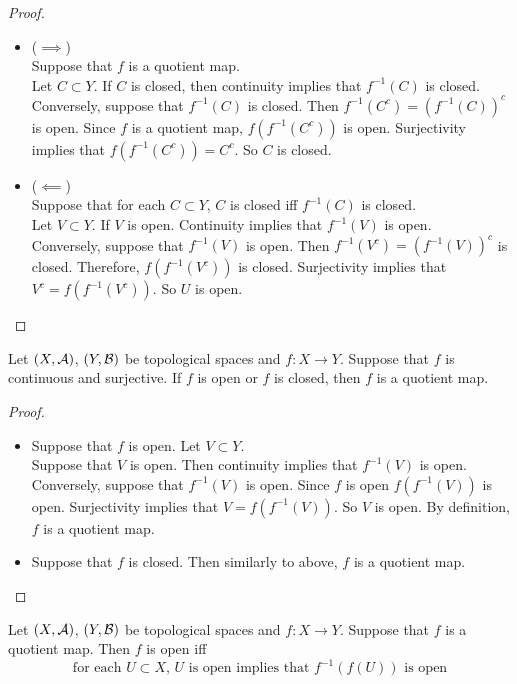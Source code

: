 \documentclass{book}
\begin{document}
	\begin{proof}\
	\begin{itemize}
	\item ($\implies$) \\
	Suppose that $f$ is a quotient map.\\
	Let $C \subset Y$. If $C$ is closed, then continuity implies that $f^{-1}(C)$ is closed.\\ 
	Conversely, suppose that $f^{-1}(C)$ is closed. Then $f^{-1}(C^c) = (f^{-1}(C))^c$ is open. Since $f$ is a quotient map, $f(f^{-1}(C^c))$ is open. Surjectivity implies that $f(f^{-1}(C^c)) = C^c$. So $C$ is closed. 
	\item ($\impliedby$) \\
	Suppose that for each $C \subset Y$, $C$ is closed iff $f^{-1}(C)$ is closed. \\
	Let $V \subset Y$. If $V$ is open. Continuity implies that $f^{-1}(V)$ is open.\\ 
	Conversely, suppose that $f^{-1}(V)$ is open. Then $ f^{-1}(V^c) = (f^{-1}(V))^c$ is closed. Therefore, $f(f^{-1}(V^c))$ is closed. Surjectivity implies that $V^c = f(f^{-1}(V^c))$. So $U$ is open.
	\end{itemize}
	\end{proof}
	
	\begin{ex} 
	Let $(X, \mathcal{A})$, $(Y, \mathcal{B})$ be topological spaces and $f:X \rightarrow Y$. Suppose that $f$ is continuous and surjective. If $f$ is open or $f$ is closed, then $f$ is a quotient map. 
	\end{ex}
	
	\begin{proof}\
	\begin{itemize}	
	\item Suppose that $f$ is open. Let $V \subset Y$. \\
	Suppose that $V$ is open. Then continuity implies that $f^{-1}(V)$ is open. Conversely, suppose that $f^{-1}(V)$ is open. Since $f$ is open $f(f^{-1}(V))$ is open. Surjectivity implies that $V = f(f^{-1}(V))$. So $V$ is open. By definition, $f$ is a quotient map.\\
	\item   
	Suppose that $f$ is closed. Then similarly to above, $f$ is a quotient map.
	\end{itemize}
	\end{proof}
	
	\begin{ex} 
	Let $(X, \mathcal{A})$, $(Y, \mathcal{B})$ be topological spaces and $f:X \rightarrow Y$. Suppose that $f$ is a quotient map. Then $f$ is open iff 
	\begin{equation*}
	\text{for each $U \subset X$, $U$ is open implies that $f^{-1}(f(U))$ is open} 
	\end{equation*}
	\end{ex}
	
\end{document}
